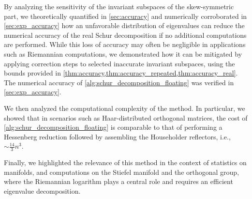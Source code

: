 \documentclass[10pt,twoside,dvipsnames]{siamart1116}
\numberwithin{algorithm}{section}
\numberwithin{equation}{section}
\begin{document}
By analyzing the sensitivity of the invariant subspaces of the skew-symmetric part, we theoretically quantified in \cref{sec:accuracy} and numerically corroborated in \cref{sec:exp_accuracy} how an unfavorable distribution of eigenvalues can reduce the numerical accuracy of the real Schur decomposition if no additional computations are performed. While this loss of accuracy may often be negligible in applications such as Riemannian computations, we demonstrated how it can be mitigated by applying correction steps to selected inaccurate invariant subspaces, using the bounds provided in \cref{thm:accuracy,thm:accuracy_repeated,thm:accuracy_real}. The numerical accuracy of \cref{alg:schur_decomposition_floating} was verified in \cref{sec:exp_accuracy}.

We then analyzed the computational complexity of the method. In particular, we showed that in scenarios such as Haar-distributed orthogonal matrices, the cost of \cref{alg:schur_decomposition_floating} is comparable to that of performing a Hessenberg reduction followed by assembling the Householder reflectors, i.e., $\sim \frac{14}{3}n^3$.

Finally, we highlighted the relevance of this method in the context of statistics on manifolds, and computations on the Stiefel manifold and the orthogonal group, where the Riemannian logarithm plays a central role and requires an efficient eigenvalue decomposition.

\appendix
\end{document}
